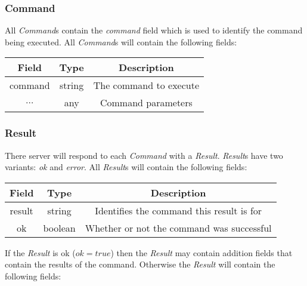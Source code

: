 \subsubsection{Command}
\label{sec:message:command}

All \emph{Command}s contain the \emph{command} field which is used to identify the command being executed.
All \emph{Command}s will contain the following fields:

\begin{table}[h!]
    \begin{center}
        \begin{tabular}{|c|c|c|}\hline
            Field & Type & Description \\\hline
            command & string & The command to execute \\\hline
            $\ldots$ & any & Command parameters \\\hline
        \end{tabular}
    \end{center}
\end{table}

\subsubsection{Result}
\label{sec:message:result}

There server will respond to each \emph{Command} with a \emph{Result}. \emph{Result}s have two 
variants: \emph{ok} and \emph{error}. All \emph{Result}s will contain the following fields:

\begin{table}[h!]
    \begin{center}
        \begin{tabular}{|c|c|c|}\hline
            Field & Type & Description \\\hline
            result & string & Identifies the command this result is for \\\hline
            ok & boolean & Whether or not the command was successful \\\hline
        \end{tabular}
    \end{center}
\end{table}

If the \emph{Result} is ok ($ok = true$) then the \emph{Result} may contain addition fields
that contain the results of the command. Otherwise the \emph{Result} will contain the following fields:

